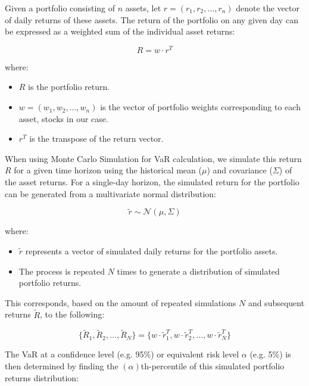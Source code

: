 \documentclass{article}
\begin{document}
Given a portfolio consisting of \(n\) assets, let \(r = (r_1, r_2, \ldots, r_n)\) denote the vector of daily returns of these assets. The return of the portfolio on any given day can be expressed as a weighted sum of the individual asset returns:

\begin{equation}
    R = w \cdot r^T
\end{equation}

where:
\begin{itemize}
  \item \(R\) is the portfolio return.
  \item \(w = (w_1, w_2, \ldots, w_n)\) is the vector of portfolio weights corresponding to each asset, stocks in our case.
  \item \(r^T\) is the transpose of the return vector.
\end{itemize}

\newpage
When using Monte Carlo Simulation for VaR calculation, we simulate this return \(R\) for a given time horizon using the historical mean (\(\mu\)) and covariance (\(\Sigma\)) of the asset returns. For a single-day horizon, the simulated return for the portfolio can be generated from a multivariate normal distribution:

\begin{equation}
  \tilde{r} \sim \mathcal{N}(\mu, \Sigma)
\end{equation}

where:
\begin{itemize}
  \item \(\tilde{r}\) represents a vector of simulated daily returns for the portfolio assets.
  \item The process is repeated \(N\) times to generate a distribution of simulated portfolio returns.
\end{itemize}

\vspace{0.3cm}
This corresponds, based on the amount of repeated simulations \(N\) and subsequent returns \(\tilde{R}\), to the following:

\begin{equation}
    \{\tilde{R}_1, \tilde{R}_2, \ldots, \tilde{R}_N\} = \{w \cdot \tilde{r}_1^T, w \cdot \tilde{r}_2^T, \ldots, w \cdot \tilde{r}_N^T\}
\end{equation}

\vspace{0.3cm}
The VaR at a confidence level (e.g. 95\%) or equivalent risk level \(\alpha\) (e.g. 5\%) is then determined by finding the \((\alpha)\)th-percentile of this simulated portfolio returns distribution:
\end{document}
